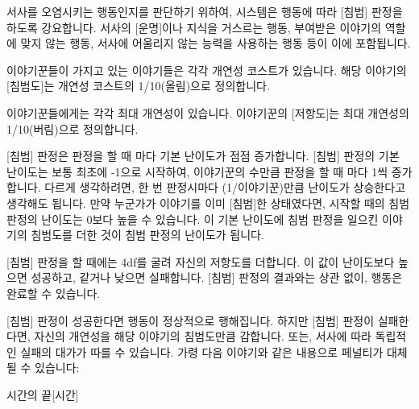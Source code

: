 \documentclass{report}
\begin{document}
	
	서사를 오염시키는 행동인지를 판단하기 위하여, 시스템은 행동에 따라 [침범] 판정을 하도록 강요합니다. 서사의 [운명]이나 지식을 거스르는 행동, 부여받은 이야기의 역할에 맞지 않는 행동, 서사에 어울리지 않는 능력을 사용하는 행동 등이 이에 포함됩니다.
	
	이야기꾼들이 가지고 있는 이야기들은 각각 개연성 코스트가 있습니다. 해당 이야기의 [침범도]는 개연성 코스트의 1/10(올림)으로 정의합니다.
	
	이야기꾼들에게는 각각 최대 개연성이 있습니다. 이야기꾼의 [저항도]는 최대 개연성의 1/10(버림)으로 정의합니다.
	
	\bigskip
	
	[침범] 판정은 판정을 할 때 마다 기본 난이도가 점점 증가합니다. [침범] 판정의 기본 난이도는 보통 최초에 -1으로 시작하여, 이야기꾼의 수만큼 판정을 할 때 마다 1씩 증가합니다. 다르게 생각하려면, 한 번 판정시마다 (1/이야기꾼)만큼 난이도가 상승한다고 생각해도 됩니다. 만약 누군가가 이야기를 이미 [침범]한 상태였다면, 시작할 때의 침범 판정의 난이도는 0보다 높을 수 있습니다. 이 기본 난이도에 침범 판정을 일으킨 이야기의 침범도를 더한 것이 침범 판정의 난이도가 됩니다.
	
	[침범] 판정을 할 때에는 4df를 굴려 자신의 저항도를 더합니다. 이 값이 난이도보다 높으면 성공하고, 같거나 낮으면 실패합니다. [침범] 판정의 결과와는 상관 없이, 행동은 완료할 수 있습니다.
	
	[침범] 판정이 성공한다면 행동이 정상적으로 행해집니다. 하지만 [침범] 판정이 실패한다면, 자신의 개연성을 해당 이야기의 침범도만큼 감합니다. 또는, 서사에 따라 독립적인 실패의 대가가 따를 수 있습니다. 가령 다음 이야기와 같은 내용으로 페널티가 대체될 수 있습니다:
	
	\begin{story}{시간의 끝}{[시간]}
	\end{story}
	
\end{document}
